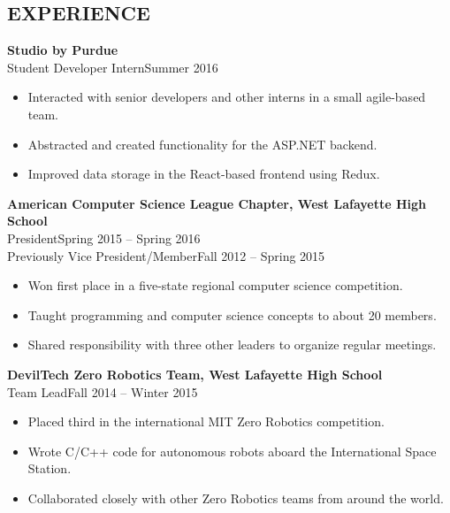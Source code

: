 \documentclass[line,margin]{res}
\begin{document}
\begin{resume}
  \section{EXPERIENCE}
  {\bf\rmfamily Studio by Purdue}\\
  Student Developer Intern\hfill Summer 2016
  \begin{itemize}  \itemsep -2pt %
  \item Interacted with senior developers and other interns in a small agile-based team.
  \item Abstracted and created functionality for the ASP.NET backend.
  \item Improved data storage in the React-based frontend using Redux.
  \end{itemize}


  {\bf\rmfamily American Computer Science League Chapter, West Lafayette High School}\\
  President\hfill Spring 2015 -- Spring 2016\\
  Previously Vice President/Member\hfill Fall 2012 -- Spring 2015
  \begin{itemize}  \itemsep -2pt %
  \item Won first place in a five-state regional computer science competition.
  \item Taught programming and computer science concepts to about 20 members.
\item Shared responsibility with three other leaders to organize regular meetings.
  \end{itemize}

  {\bf\rmfamily DevilTech Zero Robotics Team, West Lafayette High School}\\
  Team Lead\hfill Fall 2014 -- Winter 2015
  \begin{itemize}  \itemsep -2pt %
  \item Placed third in the international MIT Zero Robotics competition.
  \item Wrote C/C++ code for autonomous robots aboard the International Space Station.
  \item Collaborated closely with other Zero Robotics teams from around the world.
  \end{itemize}


\end{resume}
\end{document}
